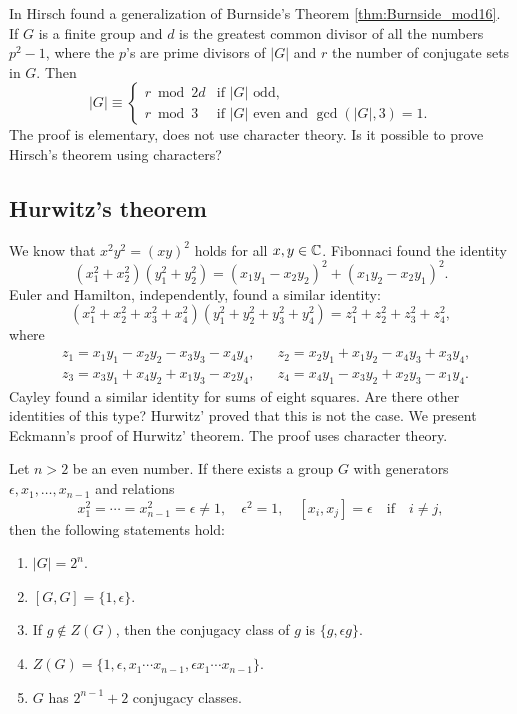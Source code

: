 In \cite{MR36755} Hirsch found a generalization of Burnside's Theorem \ref{thm:Burnside_mod16}.  
If $G$ is a finite group and $d$ is the greatest common divisor of all 
the numbers $p^2-1$, where the $p$'s are prime divisors of $|G|$ and $r$ the number of conjugate sets in $G$. Then 
\[
|G|\equiv\begin{cases} 
    r\bmod 2d &\text{if $|G|$ odd,}\\
    r\bmod 3 & \text{if $|G|$ even and $\gcd(|G|,3)=1$.}
    \end{cases}
\]
The proof is elementary, does not use character theory. Is it possible
to prove Hirsch's theorem using characters?

\subsection*{Hurwitz's theorem}
\label{Hurwitz}

We know that $x^2y^2=(xy)^2$ holds for all $x,y\in\mathbb{C}$. Fibonnaci
found the identity
\[
	(x_1^2+x_2^2)(y_1^2+y_2^2)=(x_1y_1-x_2y_2)^2+(x_1y_2-x_2y_1)^2.
\]
Euler and Hamilton, independently, found 
a similar identity:
\[
	(x_1^2+x_2^2+x_3^2+x_4^2)(y_1^2+y_2^2+y_3^2+y_4^2)=z_1^2+z_2^2+z_3^2+z_4^2,
\]
where
\begin{equation}
\label{eq:Hamilton}
\begin{aligned}
	& z_1=x_1y_1-x_2y_2-x_3y_3-x_4y_4, && 
	z_2=x_2y_1+x_1y_2-x_4y_3+x_3y_4,\\
	&z_3=x_3y_1+x_4y_2+x_1y_3-x_2y_4, && 
	z_4=x_4y_1-x_3y_2+x_2y_3-x_1y_4.
\end{aligned}
\end{equation}
Cayley found a similar identity for sums of eight squares. 
Are there other identities of this type? Hurwitz' proved that this is not the case. 
We present Eckmann's proof of Hurwitz' theorem. The proof uses character theory.

\begin{lemma}
	Let $n>2$ be an even number. If 
	there exists a group $G$ with generators
	$\epsilon,x_1,\dots,x_{n-1}$ and relations 
	\[
		x_1^2=\cdots=x_{n-1}^2=\epsilon\ne1,\quad
		\epsilon^2=1,\quad
		[x_i,x_j]=\epsilon\quad\text{if}\quad i\ne j,
	\]
	then the following statements hold:
	\begin{enumerate}
		\item $|G|=2^n$.
		\item $[G,G]=\{1,\epsilon\}$.
		\item If $g\not\in Z(G)$, then the conjugacy class of $g$ is $\{g,\epsilon g\}$.
		\item $Z(G)=\{1,\epsilon,x_1\cdots x_{n-1},\epsilon x_1\cdots x_{n-1}\}$. 
		\item $G$ has $2^{n-1}+2$ conjugacy classes.
	\end{enumerate}
\end{lemma}

